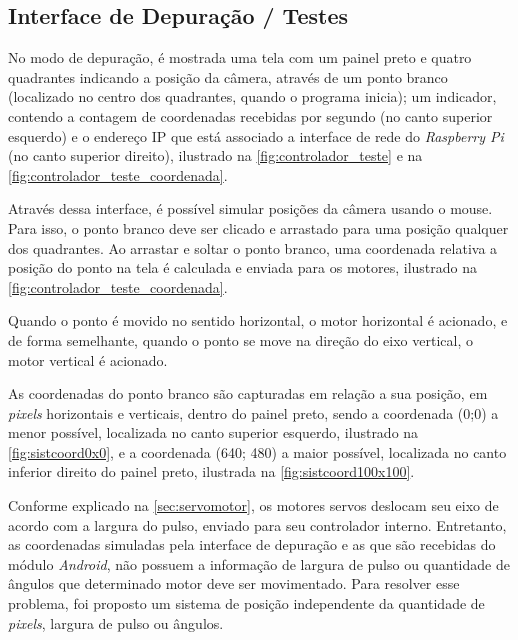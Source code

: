 \subsection{Interface de Depuração / Testes}
\label{subsec:iterfacedepuracao}

No modo de depuração, é mostrada uma tela com um painel preto e quatro quadrantes indicando a posição da câmera, através de um ponto branco (localizado no centro dos quadrantes, quando o programa inicia); um indicador, contendo a contagem de coordenadas recebidas por segundo (no canto superior esquerdo) e o endereço IP que está associado a interface de rede do \textit{Raspberry Pi} (no canto superior direito), ilustrado na \autoref{fig:controlador_teste} e na \autoref{fig:controlador_teste_coordenada}. \par

Através dessa interface, é possível simular posições da câmera usando o mouse. Para isso, o ponto branco deve ser clicado e arrastado para uma posição qualquer dos quadrantes. Ao arrastar e soltar o ponto branco, uma coordenada relativa a posição do ponto na tela é calculada e enviada para os motores, ilustrado na \autoref{fig:controlador_teste_coordenada}.\par

Quando o ponto é movido no sentido horizontal, o motor horizontal é acionado, e de forma semelhante, quando o ponto se move na direção do eixo vertical, o motor vertical é acionado.\par

As coordenadas do ponto branco são capturadas em relação a sua posição, em \textit{pixels} horizontais e verticais, dentro do painel preto, sendo a coordenada (0;0) a menor possível, localizada no canto superior esquerdo, ilustrado na \autoref{fig:sistcoord0x0}, e a coordenada (640; 480) a maior possível, localizada no canto inferior direito do painel preto, ilustrada na \autoref{fig:sistcoord100x100}.\par

Conforme explicado na \autoref{sec:servomotor}, os motores servos deslocam seu eixo de acordo com a largura do pulso, enviado para seu controlador interno. Entretanto, as coordenadas simuladas pela interface de depuração e as que são recebidas do módulo \textit{Android}, não possuem a informação de largura de pulso ou quantidade de ângulos que determinado motor deve ser movimentado. Para resolver esse problema, foi proposto um sistema de posição independente da quantidade de \textit{pixels}, largura de pulso ou ângulos.\par

